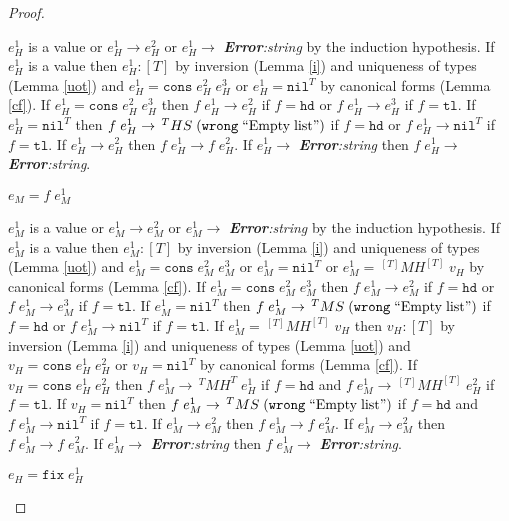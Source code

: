 \begin{theorem}
\begin{proof}
\begin{case}
$e_{H}^{1}$ is a value or $e_{H}^{1}\rightarrow e_{H}^{2}$ or $e_{H}^{1}\rightarrow$ \emph{\textbf{Error}:\;string} by the induction hypothesis.  If $e_{H}^{1}$ is a value then $e_{H}^{1}:[T]$ by inversion (Lemma \ref{i}) and uniqueness of types (Lemma \ref{uot}) and $e_{H}^{1}=\mathtt{cons}\;e_{H}^{2}\;e_{H}^{3}$ or $e_{H}^{1}=\mathtt{nil}^{T}$ by canonical forms (Lemma \ref{cf}).  If $e_{H}^{1}=\mathtt{cons}\;e_{H}^{2}\;e_{H}^{3}$ then $f\;e_{H}^{1}\rightarrow e_{H}^{2}$ if $f=\mathtt{hd}$ or $f\;e_{H}^{1}\rightarrow e_{H}^{3}$ if $f=\mathtt{tl}$.  If $e_{H}^{1}=\mathtt{nil}^{T}$ then $f\;e_{H}^{1}\rightarrow\,^{T}HS\;(\mathtt{wrong}\;\mathrm{``Empty\;list"})$ if $f=\mathtt{hd}$ or $f\;e_{H}^{1}\rightarrow\mathtt{nil}^{T}$ if $f=\mathtt{tl}$.  If $e_{H}^{1}\rightarrow e_{H}^{2}$ then $f\;e_{H}^{1}\rightarrow f\;e_{H}^{2}$.  If $e_{H}^{1}\rightarrow$ \emph{\textbf{Error}:\;string} then $f\;e_{H}^{1}\rightarrow$ \emph{\textbf{Error}:\;string}.
\end{case}
\begin{case}
$e_{M}=f\;e_{M}^{1}$

$e_{M}^{1}$ is a value or $e_{M}^{1}\rightarrow e_{M}^{2}$ or $e_{M}^{1}\rightarrow$ \emph{\textbf{Error}:\;string} by the induction hypothesis.  If $e_{M}^{1}$ is a value then $e_{M}^{1}:[T]$ by inversion (Lemma \ref{i}) and uniqueness of types (Lemma \ref{uot}) and $e_{M}^{1}=\mathtt{cons}\;e_{M}^{2}\;e_{M}^{3}$ or $e_{M}^{1}=\mathtt{nil}^{T}$ or $e_{M}^{1}=\,^{[T]}MH^{[T]}\;v_{H}$ by canonical forms (Lemma \ref{cf}).  If $e_{M}^{1}=\mathtt{cons}\;e_{M}^{2}\;e_{M}^{3}$ then $f\;e_{M}^{1}\rightarrow e_{M}^{2}$ if $f=\mathtt{hd}$ or $f\;e_{M}^{1}\rightarrow e_{M}^{3}$ if $f=\mathtt{tl}$.  If $e_{M}^{1}=\mathtt{nil}^{T}$ then $f\;e_{M}^{1}\rightarrow\,^{T}MS\;(\mathtt{wrong}\;\mathrm{``Empty\;list"})$ if $f=\mathtt{hd}$ or $f\;e_{M}^{1}\rightarrow\mathtt{nil}^{T}$ if $f=\mathtt{tl}$.  If $e_{M}^{1}=\,^{[T]}MH^{[T]}\;v_{H}$ then $v_{H}:[T]$ by inversion (Lemma \ref{i}) and uniqueness of types (Lemma \ref{uot}) and $v_{H}=\mathtt{cons}\;e_{H}^{1}\;e_{H}^{2}$ or $v_{H}=\mathtt{nil}^{T}$ by canonical forms (Lemma \ref{cf}).  If $v_{H}=\mathtt{cons}\;e_{H}^{1}\;e_{H}^{2}$ then $f\;e_{M}^{1}\rightarrow\,^{T}MH^{T}\;e_{H}^{1}$ if $f=\mathtt{hd}$ and $f\;e_{M}^{1}\rightarrow\,^{[T]}MH^{[T]}\;e_{H}^{2}$ if $f=\mathtt{tl}$.  If $v_{H}=\mathtt{nil}^{T}$ then $f\;e_{M}^{1}\rightarrow\,^{T}MS\;(\mathtt{wrong}\;\mathrm{``Empty\;list"})$ if $f=\mathtt{hd}$ and $f\;e_{M}^{1}\rightarrow\mathtt{nil}^{T}$ if $f=\mathtt{tl}$.  If $e_{M}^{1}\rightarrow e_{M}^{2}$ then $f\;e_{M}^{1}\rightarrow f\;e_{M}^{2}$.  If $e_{M}^{1}\rightarrow e_{M}^{2}$ then $f\;e_{M}^{1}\rightarrow f\;e_{M}^{2}$.  If $e_{M}^{1}\rightarrow$ \emph{\textbf{Error}:\;string} then $f\;e_{M}^{1}\rightarrow$ \emph{\textbf{Error}:\;string}.
\end{case}
\begin{case}
$e_{H}=\mathtt{fix}\;e_{H}^{1}$


\end{case}
\end{proof}
\end{theorem}
